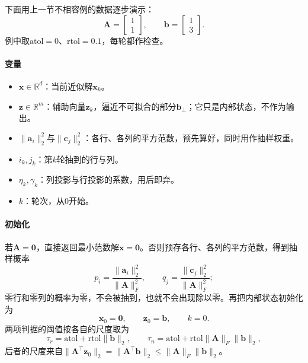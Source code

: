 下面用上一节不相容例的数据逐步演示：
\[
 \bm A=\begin{bmatrix}1\\1\end{bmatrix},\qquad \bm b=\begin{bmatrix}1\\3\end{bmatrix}.
\]
例中取$\mathrm{atol}=0$、$\mathrm{rtol}=0.1$，每轮都作检查。

\paragraph{变量}
\begin{itemize}
 \item $\bm x\in\mathbb R^d$：当前近似解$\bm x_k$。
 \item $\bm z\in\mathbb R^m$：辅助向量$\bm z_k$，逼近不可拟合的部分$\bm b_\perp$；它只是内部状态，不作为输出。
 \item $\lVert\bm a_i\rVert_2^2$与$\lVert\bm c_j\rVert_2^2$：各行、各列的平方范数，预先算好，同时用作抽样权重。
 \item $i_k,j_k$：第$k$轮抽到的行与列。
 \item $\eta_k,\gamma_k$：列投影与行投影的系数，用后即弃。
 \item $k$：轮次，从$0$开始。
\end{itemize}

\paragraph{初始化}
若$\bm A=\bm0$，直接返回最小范数解$\bm x=\bm0$。否则预存各行、各列的平方范数，得到抽样概率
\begin{equation}
 p_i=\frac{\lVert\bm a_i\rVert_2^2}{\lVert\bm A\rVert_F^2},\qquad
 q_j=\frac{\lVert\bm c_j\rVert_2^2}{\lVert\bm A\rVert_F^2};
 \label{eq:ls-extended-kaczmarz-sampling}
\end{equation}
零行和零列的概率为零，不会被抽到，也就不会出现除以零。再把内部状态初始化为
\[
 \bm x_0=\bm0,\qquad \bm z_0=\bm b,\qquad k=0 .
\]
两项判据的阈值按各自的尺度取为
\begin{equation}
 \tau_r=\mathrm{atol}+\mathrm{rtol}\lVert\bm b\rVert_2,\qquad
 \tau_n=\mathrm{atol}+\mathrm{rtol}\lVert\bm A\rVert_F\lVert\bm b\rVert_2 ,
 \label{eq:ls-extended-kaczmarz-thresholds}
\end{equation}
后者的尺度来自$\lVert\bm A^\top\bm z_0\rVert_2=\lVert\bm A^\top\bm b\rVert_2\leq\lVert\bm A\rVert_F\lVert\bm b\rVert_2$。

